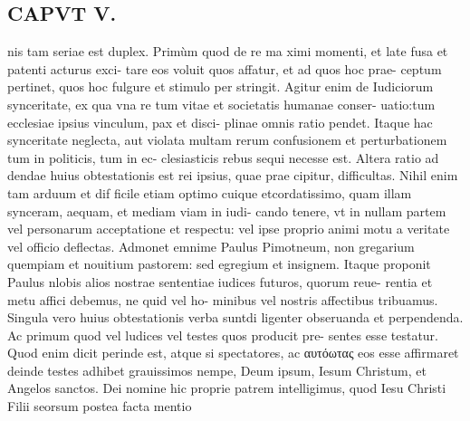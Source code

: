 \documentclass{article}
\begin{document}
\begin{pages}
\section*{CAPVT  V. }
\marginpar{[ p.329 ]}\pstart nis tam seriae est duplex. Primùm quod de re ma ximi momenti, et late fusa et patenti acturus exci- tare eos voluit quos affatur, et ad quos hoc prae- ceptum pertinet, quos hoc fulgure et stimulo per stringit. Agitur enim de Iudiciorum synceritate, ex qua vna re tum vitae et societatis humanae conser- uatio:tum ecclesiae ipsius vinculum, pax et disci- plinae omnis ratio pendet. Itaque hac synceritate neglecta, aut violata multam rerum confusionem et perturbationem tum in politicis, tum in ec- clesiasticis rebus sequi necesse est. Altera ratio ad dendae huius obtestationis est rei ipsius, quae prae cipitur, difficultas. Nihil enim tam arduum et dif ficile etiam optimo cuique etcordatissimo, quam illam synceram, aequam, et mediam viam in iudi- cando tenere, vt in nullam partem vel personarum acceptatione et respectu: vel ipse proprio animi motu a veritate vel officio deflectas. Admonet emnime Paulus Pimotneum, non gregarium quempiam et nouitium pastorem: sed egregium et insignem. Itaque proponit Paulus nlobis alios nostrae sententiae iudices futuros, quorum reue- rentia et metu affici debemus, ne quid vel ho- minibus vel nostris affectibus tribuamus.  \pend\pstart Singula vero huius obtestationis verba suntdi ligenter obseruanda et perpendenda. Ac primum quod vel ludices vel testes quos producit pre- sentes esse testatur. Quod enim dicit perinde est, atque  si spectatores, ac αυτόωτας eos esse affirmaret deinde testes adhibet grauissimos nempe, Deum ipsum, Iesum Christum, et Angelos sanctos. Dei nomine hic proprie patrem intelligimus, quod Iesu Christi Filii seorsum postea facta mentio  \pend

\end{pages}
\end{document}
